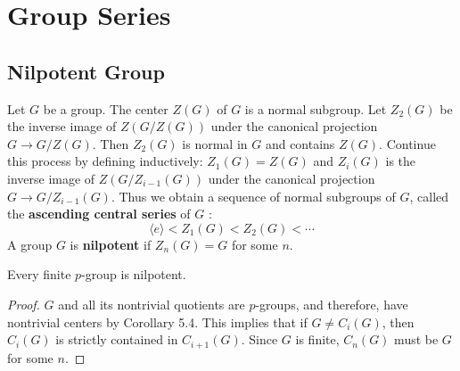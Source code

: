 \chapter{Group Series}

\section{Nilpotent Group} %
\begin{definition}
    Let $G$ be a group. The center $Z(G)$ of $G$ is a normal subgroup.
    Let $Z_2(G)$ be the inverse image of $Z(G / Z(G))$ under the canonical projection $G \rightarrow G / Z(G)$.
    Then $Z_2(G)$ is normal in $G$ and contains $Z(G)$.
    Continue this process by defining inductively: $Z_1(G)=Z(G)$ and $Z_i(G)$ is the inverse image of $Z\left(G / Z_{i-1}(G)\right)$ under the canonical projection $G \rightarrow G / Z_{i-1}(G)$. Thus we obtain a sequence of normal subgroups of $G$, called the \textbf{ascending central series} of $G$ :
    \begin{equation*}
        \langle e\rangle<Z_1(G)<Z_2(G)<\cdots
    \end{equation*}
    A group $G$ is \textbf{nilpotent} if $Z_n(G)=G$ for some $n$.
\end{definition}
\begin{theorem}
    Every finite $p$-group is nilpotent.
    \begin{proof}
        $G$ and all its nontrivial quotients are $p$-groups, and therefore, have nontrivial centers by Corollary 5.4. This implies that if $G \neq C_i(G)$, then $C_i(G)$ is strictly contained in $C_{i+1}(G)$. Since $G$ is finite, $C_n(G)$ must be $G$ for some $n$.
    \end{proof}
\end{theorem}

